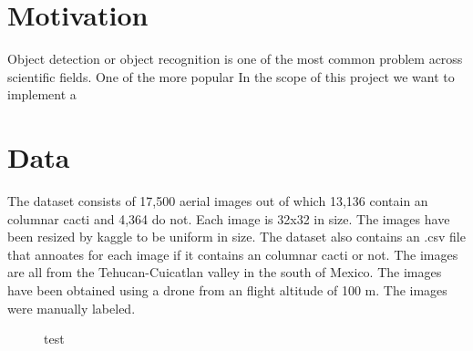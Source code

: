 \newcommand{\feat}{\texttt}







\section{Motivation}
Object detection or object recognition is one of the most common problem across scientific fields. One of the more popular In the scope of this project we want to implement a 


\section{Data}
The dataset consists of 17,500 aerial images out of which 13,136 contain an columnar cacti  and 4,364 do not.  Each image is 32x32 in size. The images have been resized by kaggle to be uniform in size. The dataset also contains an .csv file that annoates for each image if it contains an columnar cacti or not. The images are all from the Tehucan-Cuicatlan valley in the south of Mexico.  \cite{LOPEZJIMENZ2019} The images have been obtained using a drone from an flight altitude of 100 m. The images were manually labeled.
      \begin{figure}[!htb]
        \caption{\label{fig1} test \cite{whit}}
      \end{figure}